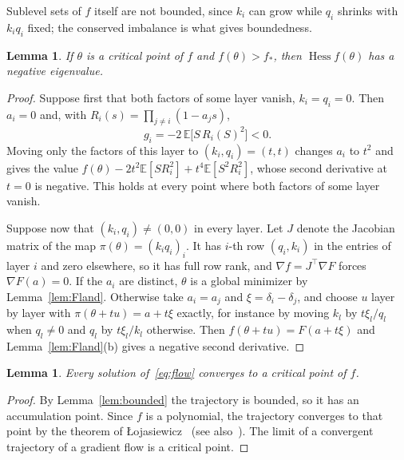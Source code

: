 \documentclass[11pt]{amsart}
\newtheorem{lemma}[theorem]{Lemma}
\theoremstyle{remark}
\numberwithin{equation}{section}
\newcommand{\EE}{\mathbb{E}}
\DeclareMathOperator{\Hess}{Hess}
\begin{document}
Sublevel sets of $f$ itself are not bounded, since $k_i$ can grow while $q_i$ shrinks with $k_iq_i$ fixed; the conserved imbalance is what gives boundedness.

\begin{lemma}\label{lem:saddle}
If $\theta$ is a critical point of $f$ and $f(\theta)>f_*$, then $\Hess f(\theta)$ has a negative eigenvalue.
\end{lemma}

\begin{proof}
Suppose first that both factors of some layer vanish, $k_i=q_i=0$. Then $a_i=0$ and, with $R_i(s)=\prod_{j\ne i}(1-a_js)$,
\[
g_i=-2\,\EE\bigl[S\,R_i(S)^2\bigr]<0.
\]
Moving only the factors of this layer to $(k_i,q_i)=(t,t)$ changes $a_i$ to $t^2$ and gives the value $f(\theta)-2t^2\EE[SR_i^2]+t^4\EE[S^2R_i^2]$, whose second derivative at $t=0$ is negative. This holds at every point where both factors of some layer vanish.

Suppose now that $(k_i,q_i)\ne(0,0)$ in every layer. Let $J$ denote the Jacobian matrix of the map $\pi(\theta)=(k_iq_i)_i$. It has $i$-th row $(q_i,k_i)$ in the entries of layer $i$ and zero elsewhere, so it has full row rank, and $\nabla f=J^{\top}\nabla F$ forces $\nabla F(a)=0$. If the $a_i$ are distinct, $\theta$ is a global minimizer by Lemma~\ref{lem:Fland}. Otherwise take $a_i=a_j$ and $\xi=\delta_i-\delta_j$, and choose $u$ layer by layer with $\pi(\theta+tu)=a+t\xi$ exactly, for instance by moving $k_l$ by $t\xi_l/q_l$ when $q_l\ne0$ and $q_l$ by $t\xi_l/k_l$ otherwise. Then $f(\theta+tu)=F(a+t\xi)$ and Lemma~\ref{lem:Fland}(b) gives a negative second derivative.
\end{proof}

\begin{lemma}\label{lem:single}
Every solution of~\eqref{eq:flow} converges to a critical point of $f$.
\end{lemma}

\begin{proof}
By Lemma~\ref{lem:bounded} the trajectory is bounded, so it has an accumulation point. Since $f$ is a polynomial, the trajectory converges to that point by the theorem of \L{}ojasiewicz~\cite{Loj84} (see also~\cite[(0.2) and Section~1]{ColdingMinicozzi}). The limit of a convergent trajectory of a gradient flow is a critical point.
\end{proof}
\end{document}
